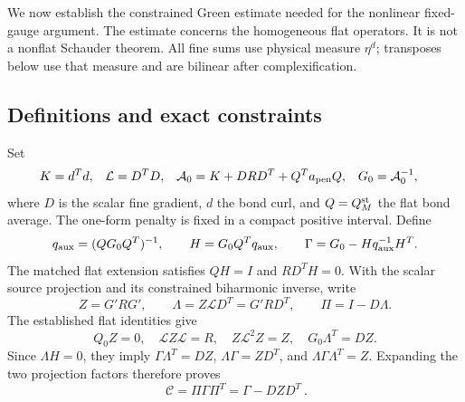 \documentclass[11pt]{article}
\theoremstyle{remark}
\begin{document}
We now establish the constrained Green estimate needed for the
nonlinear fixed-gauge argument. The estimate concerns the
homogeneous flat operators. It is not a nonflat Schauder theorem.
All fine sums use physical measure $\eta^d$; transposes below use
that measure and are bilinear after complexification.

\subsection{Definitions and exact constraints}
\label{cg-algebra}

Set
\begin{align}
 K&=d^Td,&\mathcal L&=D^TD,&
 \mathcal A_0&=K+DRD^T+Q^Ta_{\rm pen}Q,&G_0&=\mathcal A_0^{-1},
                                                        \label{cg-flat}\end{align}
where $D$ is the scalar fine gradient, $d$ the bond curl, and
$Q=Q_M^{\rm st}$ the flat bond average. The one-form penalty is
fixed in a compact positive interval. Define
\begin{equation}\label{cg-extension}
 q_{\rm aux}=(QG_0Q^T)^{-1},\qquad
 H=G_0Q^Tq_{\rm aux},\qquad
 \Gamma=G_0-Hq_{\rm aux}^{-1}H^T.
\end{equation}
The matched flat extension satisfies $QH=I$ and $RD^TH=0$.
With the scalar source projection and its constrained biharmonic
inverse, write
\begin{equation}\label{cg-projection}
 Z=G'RG',\qquad \Lambda=Z\mathcal LD^T=G'RD^T,
 \qquad \Pi=I-D\Lambda.
\end{equation}
The established flat identities give
\begin{equation}\label{cg-scalar-identities}
 Q_0Z=0,\quad \mathcal LZ\mathcal L=R,\quad
 Z\mathcal L^2Z=Z,\quad G_0\Lambda^T=DZ.
\end{equation}
Since $\Lambda H=0$, they imply
$\Gamma\Lambda^T=DZ$,
$\Lambda\Gamma=ZD^T$, and
$\Lambda\Gamma\Lambda^T=Z$.
Expanding the two projection factors therefore proves
\begin{equation}\label{cg-constrained}
 \boxed{\ \mathcal C=\Pi\Gamma\Pi^T=\Gamma-DZD^T\ }.
\end{equation}
\end{document}
